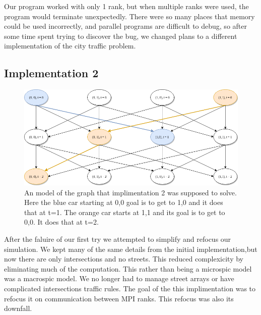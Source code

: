 \documentclass[10pt,a4paper]{article}
\begin{document}
Our program worked with only 1 rank, but when multiple ranks were used, the program would terminate unexpectedly. There were so many places that memory could be used incorrectly, and parallel programs are difficult to debug, so after some time spent trying to discover the bug, we changed plans to a different implementation of the city traffic problem.

\subsection{Implementation 2}

\begin{figure}
    \centering
    \includegraphics[scale=0.5]{imp2_diag.png}
    \caption{An model of the graph that implimentation 2 was supposed to solve. Here the blue car starting at 0,0 goal is to get to 1,0 and it does that at t=1. The orange car starts at 1,1 and its goal is to get to 0,0. It does that at t=2.}
    \label{fig:my_label}
\end{figure}


After the faluire of our first try we attempted to simplify and refocus our simulation. We kept many of the same details from the initial implementation,but now there are only intersections and no streets. This reduced complexicity by eliminating much of the computation. This rather than being a microspic model was a macrospic model. We no longer had to manage street arrays or have complicated intersections traffic rules. The goal of the this implimentation was to refocus it on communication between MPI ranks. This refocus was also its downfall. 
\end{document}
